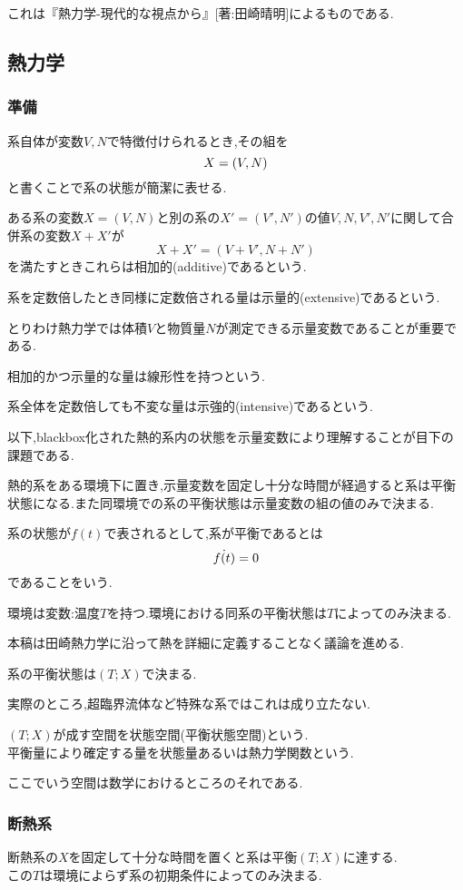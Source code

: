 \documentclass[dvipdfmx,uplatex]{jsarticle}
\begin{document}
これは『熱力学-現代的な視点から』[著:田崎晴明]によるものである.
\subsection{熱力学}
\subsubsection{準備}
系自体が変数$V,N$で特徴付けられるとき,その組を
\[
X = (V,N) \\
\]
と書くことで系の状態が簡潔に表せる.
\begin{defi}
ある系の変数$X = (V,N)$と別の系の$X' = (V',N')$の値$V,N,V',N'$に関して合併系の変数$X+X'$が
\[
X + X' = (V+V', N+N') 
\]
を満たすときこれらは相加的(additive)であるという.
\end{defi}

\begin{defi}
系を定数倍したとき同様に定数倍される量は示量的(extensive)であるという.
\end{defi}
とりわけ熱力学では体積$V$と物質量$N$が測定できる示量変数であることが重要である.
\begin{cf}
相加的かつ示量的な量は線形性を持つという.
\end{cf}
\begin{defi}
系全体を定数倍しても不変な量は示強的(intensive)であるという.
\end{defi}


以下,blackbox化された熱的系内の状態を示量変数により理解することが目下の課題である.

\begin{law}
熱的系をある環境下に置き,示量変数を固定し十分な時間が経過すると系は平衡状態になる.また同環境での系の平衡状態は示量変数の組の値のみで決まる.
\end{law}
\begin{defi}
系の状態が$f(t)$で表されるとして,系が平衡であるとは \\
\[
\dot{f(t)} = 0 \\
\]
であることをいう.
\end{defi}
\begin{law}
環境は変数:温度$T$を持つ.環境における同系の平衡状態は$T$によってのみ決まる.
\end{law}
本稿は田崎熱力学に沿って熱を詳細に定義することなく議論を進める.

\begin{theo}
系の平衡状態は$(T;X)$で決まる.
\end{theo}
実際のところ,超臨界流体など特殊な系ではこれは成り立たない.

\begin{defi}
$(T;X)$が成す空間を状態空間(平衡状態空間)という. \\
平衡量により確定する量を状態量あるいは熱力学関数という.
\end{defi}
ここでいう空間は数学におけるところのそれである.

\subsubsection{断熱系}
\begin{law}
断熱系の$X$を固定して十分な時間を置くと系は平衡$(T;X)$に達する. \\
この$T$は環境によらず系の初期条件によってのみ決まる.
\end{law}
\end{document}
